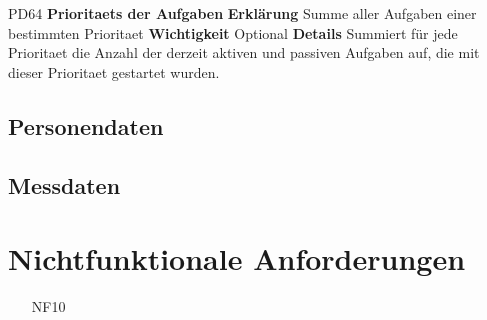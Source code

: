 \documentclass[a4paper,12pt]{article}
\begin{document}
\begin{itemize}[nosep]
\begin{minipage}[t]{\linewidth}
\item[PD64] \textbf{\glspl{Prioritaet} der Aufgaben}
\subitem \textbf{Erklärung} Summe aller Aufgaben einer bestimmten \gls{Prioritaet}
\subitem \textbf{Wichtigkeit} Optional
\subitem \textbf{Details} Summiert für jede \gls{Prioritaet} die Anzahl der derzeit aktiven und passiven Aufgaben auf, die mit dieser \gls{Prioritaet} gestartet wurden.
\end{minipage}
\pagebreak

\end{itemize}

\subsection{Personendaten}
\subsection{Messdaten}

\section{Nichtfunktionale Anforderungen}
\begin{itemize}[nosep]
\leftskip=0.5cm

\begin{comment}

\begin{minipage}[t]{\linewidth}
\item[FA00] \textbf{<Titel>}
\subitem \textbf{Erklärung} <In ca. 3 Zeilen eine grobe Beschreibung geben>
\subitem \textbf{Wichtigkeit} <Wie relevant ist es für uns, diese Anforderung zu erfüllen>
\subitem \textbf{Bezug} <Welcher funktionalen Anforderung ist diese Anforderung zuzuordnen>
\subitem \textbf{Details} <Ausführliche Beschreibung dieser nichtfunktionalen Anforderung>
\end{minipage}
\pagebreak

\end{comment}

\item[NF10]
\end{itemize}


\end{document}
